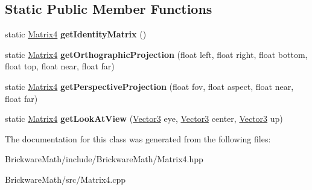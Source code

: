 \subsection*{Static Public Member Functions}
\begin{DoxyCompactItemize}
\item 
\hypertarget{classBrickware_1_1Math_1_1Matrix4_abde9dea1ad931d32b053726aca9aa68e}{}static \hyperlink{classBrickware_1_1Math_1_1Matrix4}{Matrix4} {\bfseries get\+Identity\+Matrix} ()\label{classBrickware_1_1Math_1_1Matrix4_abde9dea1ad931d32b053726aca9aa68e}

\item 
\hypertarget{classBrickware_1_1Math_1_1Matrix4_aca9d585d935b4ac62d7e8cea00c4a37f}{}static \hyperlink{classBrickware_1_1Math_1_1Matrix4}{Matrix4} {\bfseries get\+Orthographic\+Projection} (float left, float right, float bottom, float top, float near, float far)\label{classBrickware_1_1Math_1_1Matrix4_aca9d585d935b4ac62d7e8cea00c4a37f}

\item 
\hypertarget{classBrickware_1_1Math_1_1Matrix4_af9dce580eada2ec940a9b5d5a1084637}{}static \hyperlink{classBrickware_1_1Math_1_1Matrix4}{Matrix4} {\bfseries get\+Perspective\+Projection} (float fov, float aspect, float near, float far)\label{classBrickware_1_1Math_1_1Matrix4_af9dce580eada2ec940a9b5d5a1084637}

\item 
\hypertarget{classBrickware_1_1Math_1_1Matrix4_ada5d98a0ee3adb405409b2832080e86f}{}static \hyperlink{classBrickware_1_1Math_1_1Matrix4}{Matrix4} {\bfseries get\+Look\+At\+View} (\hyperlink{classBrickware_1_1Math_1_1Vector3}{Vector3} eye, \hyperlink{classBrickware_1_1Math_1_1Vector3}{Vector3} center, \hyperlink{classBrickware_1_1Math_1_1Vector3}{Vector3} up)\label{classBrickware_1_1Math_1_1Matrix4_ada5d98a0ee3adb405409b2832080e86f}

\end{DoxyCompactItemize}


The documentation for this class was generated from the following files\+:\begin{DoxyCompactItemize}
\item 
Brickware\+Math/include/\+Brickware\+Math/Matrix4.\+hpp\item 
Brickware\+Math/src/Matrix4.\+cpp\end{DoxyCompactItemize}
